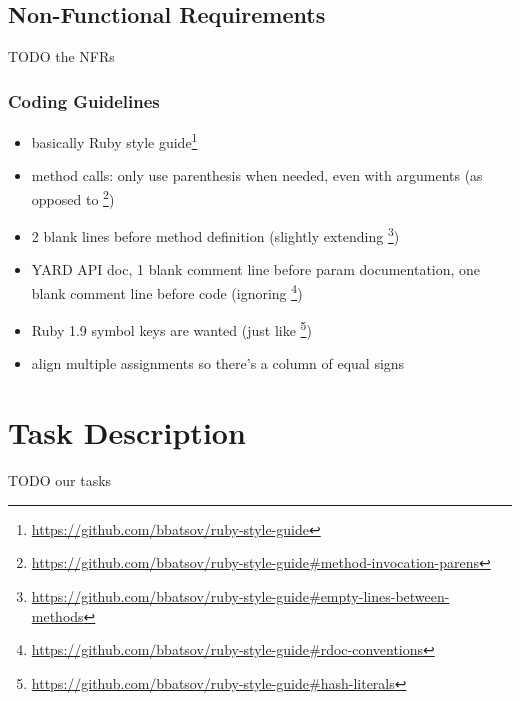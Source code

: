 \subsection{Non-Functional Requirements}
TODO the NFRs

\subsubsection{Coding Guidelines}
\begin{itemize}
	\item basically Ruby style guide\footnote{\url{https://github.com/bbatsov/ruby-style-guide}}
	\item method calls: only use parenthesis when needed, even with arguments (as opposed to \footnote{\url{https://github.com/bbatsov/ruby-style-guide\#method-invocation-parens}})
	\item 2 blank lines before method definition (slightly extending \footnote{\url{https://github.com/bbatsov/ruby-style-guide\#empty-lines-between-methods}})
	\item YARD API doc, 1 blank comment line before param documentation, one blank comment line before code (ignoring \footnote{\url{https://github.com/bbatsov/ruby-style-guide\#rdoc-conventions}})
	\item Ruby 1.9 symbol keys are wanted (just like \footnote{\url{https://github.com/bbatsov/ruby-style-guide\#hash-literals}})
	\item align multiple assignments so there's a column of equal signs
\end{itemize}


\section{Task Description}
TODO our tasks

